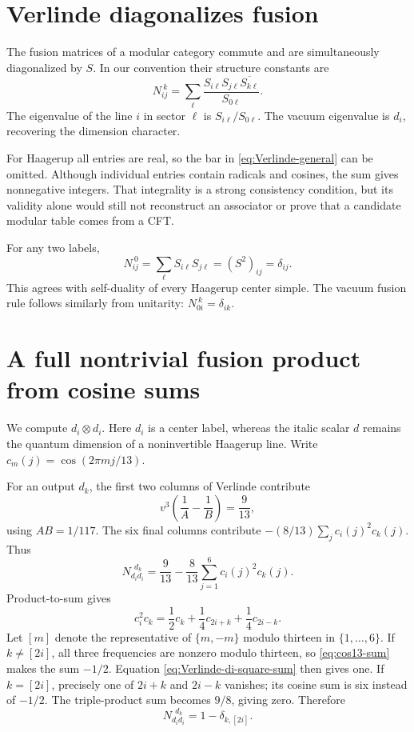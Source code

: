 \section{Verlinde diagonalizes fusion}

The fusion matrices of a modular category commute and are
simultaneously diagonalized by $S$.  In our convention their
structure constants are
\begin{equation}
 N_{ij}^{\ k}=\sum_\ell
 \frac{S_{i\ell}S_{j\ell}\overline{S_{k\ell}}}
 {S_{0\ell}}.
 \label{eq:Verlinde-general}
\end{equation}
The eigenvalue of the line $i$ in sector $\ell$ is
$S_{i\ell}/S_{0\ell}$.  The vacuum eigenvalue is $d_i$,
recovering the dimension character.

For Haagerup all entries are real, so the bar in
\eqref{eq:Verlinde-general} can be omitted.  Although individual
entries contain radicals and cosines, the sum gives nonnegative
integers.  That integrality is a strong consistency condition, but
its validity alone would still not reconstruct an associator or
prove that a candidate modular table comes from a CFT.

\begin{example}
For any two labels,
\[
 N_{ij}^{\ 0}=\sum_\ell S_{i\ell}S_{j\ell}
 =(S^2)_{ij}=\delta_{ij}.
\]
This agrees with self-duality of every Haagerup center simple.
The vacuum fusion rule follows similarly from unitarity:
$N_{0i}^{\ k}=\delta_{ik}$.
\end{example}

\section{A full nontrivial fusion product from cosine sums}

We compute $d_i\otimes d_i$.  Here $d_i$ is a center label,
whereas the italic scalar $d$ remains the quantum dimension of a
noninvertible Haagerup line.  Write
$c_m(j)=\cos(2\pi mj/13)$.

For an output $d_k$, the first two columns of Verlinde contribute
\[
 v^3\left(\frac1A-\frac1B\right)=\frac9{13},
\]
using $AB=1/117$.  The six final columns contribute
$-(8/13)\sum_j c_i(j)^2c_k(j)$.  Thus
\begin{equation}
 N_{d_i d_i}^{\ \ d_k}
 =\frac9{13}-\frac8{13}
 \sum_{j=1}^6 c_i(j)^2c_k(j).
 \label{eq:Verlinde-di-square-sum}
\end{equation}
Product-to-sum gives
\[
 c_i^2c_k=\frac12c_k+\frac14c_{2i+k}+\frac14c_{2i-k}.
\]
Let $[m]$ denote the representative of $\{m,-m\}$ modulo
thirteen in $\{1,\ldots,6\}$.  If $k\ne[2i]$, all three
frequencies are nonzero modulo thirteen, so
\eqref{eq:cos13-sum} makes the sum $-1/2$.  Equation
\eqref{eq:Verlinde-di-square-sum} then gives one.
If $k=[2i]$, precisely one of $2i+k$ and $2i-k$ vanishes;
its cosine sum is six instead of $-1/2$.  The triple-product sum
becomes $9/8$, giving zero.  Therefore
\begin{equation}
 N_{d_i d_i}^{\ \ d_k}=1-\delta_{k,[2i]}.
 \label{eq:Verlinde-di-square-residual}
\end{equation}

